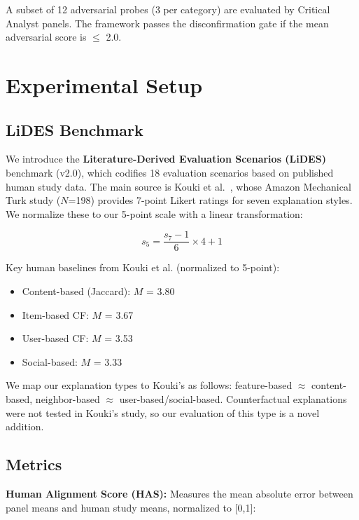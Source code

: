 \documentclass[sigconf,nonacm]{acmart}
\begin{document}
A subset of 12 adversarial probes (3 per category) are evaluated by Critical Analyst panels. The framework passes the disconfirmation gate if the mean adversarial score is $\leq$ 2.0.

\section{Experimental Setup}
\label{sec:setup}

\subsection{LiDES Benchmark}

We introduce the \textbf{Literature-Derived Evaluation Scenarios (LiDES)} benchmark (v2.0), which codifies 18 evaluation scenarios based on published human study data. The main source is Kouki et al.~\cite{kouki2019}, whose Amazon Mechanical Turk study ($N$=198) provides 7-point Likert ratings for seven explanation styles. We normalize these to our 5-point scale with a linear transformation:

\begin{equation}
s_{5} = \frac{s_{7} - 1}{6} \times 4 + 1
\end{equation}

Key human baselines from Kouki et al. (normalized to 5-point):
\begin{itemize}[leftmargin=*]
\item Content-based (Jaccard): $M$ = 3.80
\item Item-based CF: $M$ = 3.67
\item User-based CF: $M$ = 3.53
\item Social-based: $M$ = 3.33
\end{itemize}

We map our explanation types to Kouki's as follows: feature-based $\approx$ content-based, neighbor-based $\approx$ user-based/social-based. Counterfactual explanations were not tested in Kouki's study, so our evaluation of this type is a novel addition.

\subsection{Metrics}

\textbf{Human Alignment Score (HAS):} Measures the mean absolute error between panel means and human study means, normalized to [0,1]:
\end{document}
